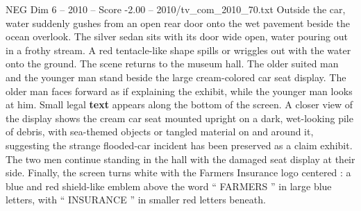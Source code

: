 \begin{textsample}{NEG Dim 6 – 2010 – Score -2.00 – 2010/tv\_com\_2010\_70.txt}
Outside the car, water suddenly gushes from an open rear door onto the wet pavement beside the ocean overlook.
The silver sedan sits with its door wide open, water pouring out in a frothy stream.
A red tentacle-like shape spills or wriggles out with the water onto the ground.
The scene returns to the museum hall.
The older suited man and the younger man stand beside the large cream-colored car seat display.
The older man faces forward as if explaining the exhibit, while the younger man looks at him.
Small legal \textbf{text} appears along the bottom of the screen.
A closer view of the display shows the cream car seat mounted upright on a dark, wet-looking pile of debris, with sea-themed objects or tangled material on and around it, suggesting the strange flooded-car incident has been preserved as a claim exhibit.
The two men continue standing in the hall with the damaged seat display at their side.
Finally, the screen turns white with the Farmers Insurance logo centered : a blue and red shield-like emblem above the word “ FARMERS ” in large blue letters, with “ INSURANCE ” in smaller red letters beneath.

\end{textsample}

